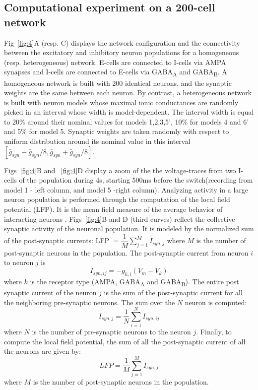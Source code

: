 \subsection{Computational experiment on a 200-cell network}
Fig~\ref{fig:4}A (resp. C) displays the network configuration and the connectivity between the excitatory and inhibitory neuron  populations for a homogeneous (resp. heterogeneous) network. E-cells are connected to I-cells via AMPA synapses and I-cells are connected to E-cells via GABA\textsubscript{A} and GABA\textsubscript{B}.  A homogeneous network is built with 200 identical neurons, and the synaptic weights are the same between each neuron. By contrast, a heterogeneous network is built with neuron models whose maximal ionic conductances are  randomly picked in an interval whose width is model-dependent. The interval width is equal to 20$\%$  around their nominal values for models 1,2,3,5', 10$\%$ for models 4 and 6' and 5$\%$ for model 5. Synaptic weights are taken randomly with respect to uniform distribution around its nominal value in this interval $[\bar{g}_{syn}- \bar{g}_{syn}/8, \bar{g}_{syn}+ \bar{g}_{syn}/8]$.

Figs~\ref{fig:4}B and ~\ref{fig:4}D display a zoom of the  the voltage-traces from two I-cells of the population during 4s,  starting 500ms before the switch(recording from model 1 - left column, and model 5 -right column). Analyzing activity in a large neuron population is performed through the computation of the local field potential (LFP). It is the mean field measure of the average behavior of interacting neurons \citep{buzsaki_rhythms_2009, lee_neuromodulation_2012, destexhe_spike-and-wave_1998}. Figs~\ref{fig:4}B and D (third curves) reflect the collective synaptic activity of the neuronal population. It is modeled by the normalized sum of the post-synaptic currents: LFP $=\dfrac{1}{M} \sum_{j=1}^M I_{syn,j}$ where $M$ is the number of post-synaptic neurons in the population. The post-synaptic current from neuron $i$ to neuron $j$ is  $$ I_{syn,ij} = - g_{k,i} (V_m - V_k) $$
where $k$ is the receptor type (AMPA, GABA\textsubscript{A}  and GABA\textsubscript{B}). The entire post synaptic current of the neuron $j$ is the sum of the post-synaptic current for all the neighboring pre-synaptic neurons. The sum over the $N$ neuron is computed: 
$$I_{syn,j}  = \dfrac{1}{N} \sum_{i=1}^N I_{syn,ij}$$
where $N$ is the number of pre-synaptic neurons to the neuron $j$.
Finally, to compute the local field potential, the sum of all the post-synaptic current of all the neurons are given by: 
$$LFP =\dfrac{1}{M} \sum_{j=1}^M I_{syn,j}$$
where $M$ is the number of post-synaptic neurons in the population.

